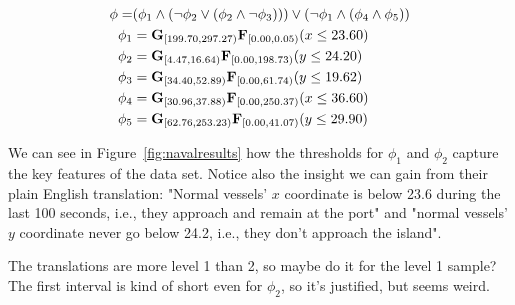 \begin{equation}
\begin{aligned}
    \phi = & ( \phi_1 \wedge (\neg \phi_2 \vee (\phi_2 \wedge \neg \phi_3))) \vee (\neg \phi_1 \wedge (\phi_4 \wedge \phi_5)) \\
    \phi_1 & = \mathbf{G}_{[199.70, 297.27)} \mathbf{F}_{[0.00, 0.05)} (x \le 23.60) \\
    \phi_2 & = \mathbf{G}_{[4.47, 16.64)} \mathbf{F}_{[0.00, 198.73)} (y \le 24.20) \\
    \phi_3 & = \mathbf{G}_{[34.40, 52.89)} \mathbf{F}_{[0.00, 61.74)} (y \le 19.62) \\
    \phi_4 & = \mathbf{G}_{[30.96, 37.88)} \mathbf{F}_{[0.00, 250.37)} (x \le 36.60) \\
    \phi_5 & = \mathbf{G}_{[62.76, 253.23)} \mathbf{F}_{[0.00, 41.07)} (y \le 29.90)
\end{aligned}
\end{equation}

We can see in Figure~\ref{fig:navalresults} how the thresholds for $\phi_1$ and $\phi_2$ capture the key features of the data set. Notice also the insight we can gain from their plain English translation: "Normal vessels' $x$ coordinate is below 23.6 during the last 100 seconds, i.e., they approach and remain at the port" and "normal vessels' $y$ coordinate never go below 24.2, i.e., they don't approach the island".

{\color{blue} The translations are more level 1 than 2, so maybe do it for the level 1 sample? The first interval is kind of short even for $\phi_2$, so it's justified, but seems weird.}

